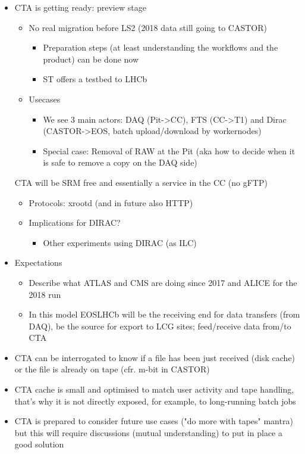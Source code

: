 \documentclass{lhcb+cta}
\begin{document}
\begin{itemize}
    \item CTA is getting ready: preview stage
    \begin{itemize}
        \item No real migration before LS2 (2018 data still going to CASTOR)
        \begin{itemize}
            \item Preparation steps (at least understanding the workflows and the product) can be done now
            \item ST offers a testbed to LHCb
        \end{itemize}
        \item Usecases
        \begin{itemize}
            \item We see 3 main actors: DAQ (Pit->CC), FTS (CC->T1) and Dirac (CASTOR->EOS, batch upload/download by workernodes)
            \item Special case: Removal of RAW at the Pit (aka how to decide when it is safe to remove a copy on the DAQ side)
        \end{itemize}
    \end{itemize}
    CTA will be SRM free and essentially a service in the CC (no gFTP)
    \begin{itemize}
        \item Protocols: xrootd (and in future also HTTP)
        \item Implications for DIRAC?
        \begin{itemize}
            \item Other experiments using DIRAC (as ILC)
        \end{itemize}
    \end{itemize}
    \item Expectations
    \begin{itemize}
        \item Describe what ATLAS and CMS are doing since 2017 and ALICE for the 2018 run
        \item In this model EOSLHCb will be the receiving end for data transfers (from DAQ), be the source for export to LCG sites; feed/receive data from/to CTA
    \end{itemize}
    \item CTA can be interrogated to know if a file has been just received (disk cache) or the file is already on tape (cfr. m-bit in CASTOR)
    \item CTA cache is small and optimised to match user activity and tape handling, that's why it is not directly exposed, for example, to long-running batch jobs
    \item CTA is prepared to consider future use cases ("do more with tapes" mantra) but this will require discussions (mutual understanding) to put in place a good solution
\end{itemize}
    
\end{document}
